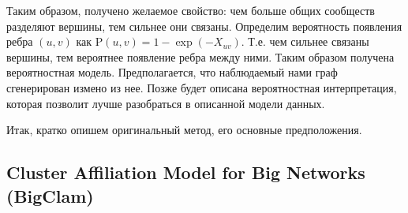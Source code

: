 \documentclass{ITaSconf}
\def\PP{\mathrm{P}}
\begin{document}
Таким образом, получено желаемое свойство: чем больше общих сообществ разделяют вершины, тем сильнее они связаны. 
Определим вероятность появления ребра $(u,v)$ как $\PP(u, v) = 1 - \exp ( - X_{uv})$. 
Т.е. чем сильнее связаны вершины, тем вероятнее появление ребра между ними. 
Таким образом получена вероятностная модель. Предполагается, что наблюдаемый нами граф сгенерирован измено из нее.
Позже будет описана вероятностная интерпретация, которая позволит лучше разобраться в описанной модели данных.

Итак, кратко опишем оригинальный метод, его основные предположения.

\subsection{Cluster Affiliation Model for Big Networks (BigClam)}
\end{document}

